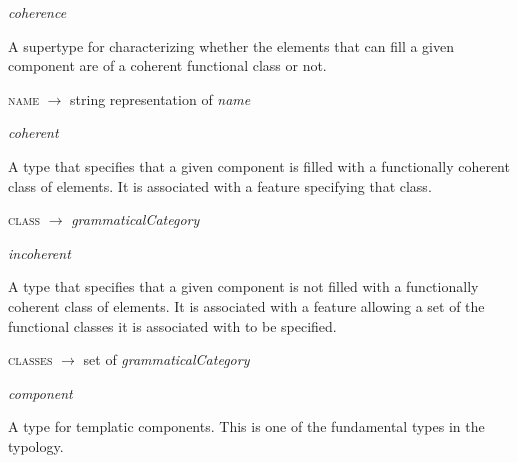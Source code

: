 \def\name{name}

\begin{ontologytop}

\item \emph{coherence}
\hspace{1em}\parbox[t]{\linegoal}{\footnotesize A supertype for characterizing whether the elements that can fill a given component are of a coherent functional class or not.}


	\begin{proplist}

	\item \textsc{\name} $\rightarrow$ string representation of \emph{name}

	\end{proplist}

	\begin{classlist}

	\item \emph{coherent}
	\hspace{1em}\parbox[t]{\linegoal}{\footnotesize A type that specifies that a given component is filled with a functionally coherent class of elements. It is associated with a feature specifying that class.}


		\begin{proplist}

		\item \textsc{class} $\rightarrow$  \emph{grammaticalCategory}

		\end{proplist}

	\item \emph{incoherent}
	\hspace{1em}\parbox[t]{\linegoal}{\footnotesize A type that specifies that a given component is not filled with a functionally coherent class of elements. It is associated with a feature allowing a set of the functional classes it is associated with to be specified.}


		\begin{proplist}

		\item \textsc{classes} $\rightarrow$ set of \emph{grammaticalCategory}

		\end{proplist}

	\end{classlist}

\item \emph{component}
\hspace{1em}\parbox[t]{\linegoal}{\footnotesize A type for templatic components. This is one of the fundamental types in the typology.}



\end{ontologytop}
